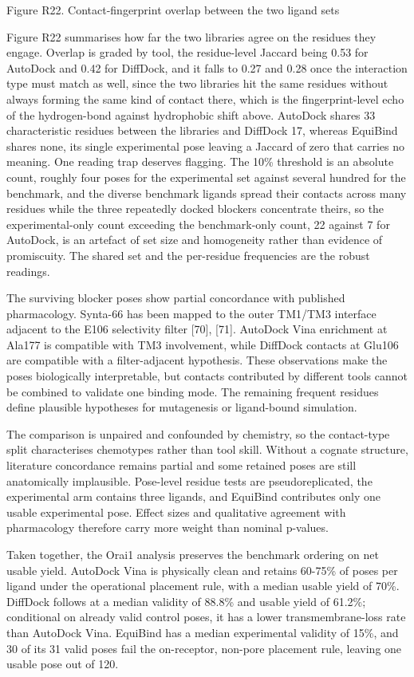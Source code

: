 Figure R22. Contact-fingerprint overlap between the two ligand sets

Figure R22 summarises how far the two libraries agree on the residues they engage. Overlap is graded by tool, the residue-level Jaccard being 0.53 for AutoDock and 0.42 for DiffDock, and it falls to 0.27 and 0.28 once the interaction type must match as well, since the two libraries hit the same residues without always forming the same kind of contact there, which is the fingerprint-level echo of the hydrogen-bond against hydrophobic shift above. AutoDock shares 33 characteristic residues between the libraries and DiffDock 17, whereas EquiBind shares none, its single experimental pose leaving a Jaccard of zero that carries no meaning. One reading trap deserves flagging. The 10\% threshold is an absolute count, roughly four poses for the experimental set against several hundred for the benchmark, and the diverse benchmark ligands spread their contacts across many residues while the three repeatedly docked blockers concentrate theirs, so the experimental-only count exceeding the benchmark-only count, 22 against 7 for AutoDock, is an artefact of set size and homogeneity rather than evidence of promiscuity. The shared set and the per-residue frequencies are the robust readings.

The surviving blocker poses show partial concordance with published pharmacology. Synta-66 has been mapped to the outer TM1/TM3 interface adjacent to the E106 selectivity filter {[}70{]}, {[}71{]}. AutoDock Vina enrichment at Ala177 is compatible with TM3 involvement, while DiffDock contacts at Glu106 are compatible with a filter-adjacent hypothesis. These observations make the poses biologically interpretable, but contacts contributed by different tools cannot be combined to validate one binding mode. The remaining frequent residues define plausible hypotheses for mutagenesis or ligand-bound simulation.

The comparison is unpaired and confounded by chemistry, so the contact-type split characterises chemotypes rather than tool skill. Without a cognate structure, literature concordance remains partial and some retained poses are still anatomically implausible. Pose-level residue tests are pseudoreplicated, the experimental arm contains three ligands, and EquiBind contributes only one usable experimental pose. Effect sizes and qualitative agreement with pharmacology therefore carry more weight than nominal p-values.

Taken together, the Orai1 analysis preserves the benchmark ordering on net usable yield. AutoDock Vina is physically clean and retains 60-75\% of poses per ligand under the operational placement rule, with a median usable yield of 70\%. DiffDock follows at a median validity of 88.8\% and usable yield of 61.2\%; conditional on already valid control poses, it has a lower transmembrane-loss rate than AutoDock Vina. EquiBind has a median experimental validity of 15\%, and 30 of its 31 valid poses fail the on-receptor, non-pore placement rule, leaving one usable pose out of 120.

